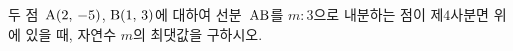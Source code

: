 두 점~$\mathrm{A}(2,\,-5)$, $\mathrm{B}(1,\,3)$에 대하여 선분~$\mathrm{AB}$를 $m:3$으로 내분하는 점이 제$4$사분면 위에 있을 때, 자연수 $m$의 최댓값을 구하시오.
